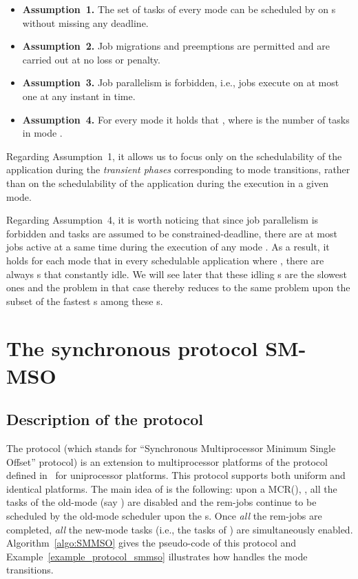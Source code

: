 \documentclass{article}
\newtheorem{validity test}{Validity Test}
\begin{document}
\begin{itemize}
\renewcommand{\labelitemi}{}
\label{null:assumption1}
\item \textbf{Assumption~1.} The set  of tasks of every mode  can be scheduled by  on  s without missing any deadline. 

\item \textbf{Assumption~2.} Job migrations and preemptions are permitted and are carried out at no loss or penalty.

\item \textbf{Assumption~3.} Job parallelism is forbidden, i.e., jobs execute on at most one  at any instant in time. 

\item \textbf{Assumption~4.} For every mode  it holds that , where  is the number of tasks in mode . 
\end{itemize}

Regarding Assumption~1, it allows us to focus only on the schedulability of the application during the {\em transient phases} corresponding to mode transitions, rather than on the schedulability of the application during the execution in a given mode. 

Regarding Assumption~4, it is worth noticing that since job parallelism is forbidden and tasks are assumed to be constrained-deadline, there are at most  jobs active at a same time during the execution of any mode . As a result, it holds for each mode  that in every schedulable application where , there are always  s that constantly idle. We will see later that these  idling s are the slowest ones and the problem in that case thereby reduces to the same problem upon the subset of the  fastest s among these  s. 




\section{The synchronous protocol SM-MSO}
\label{sec:Multimode:SMMSO}

\subsection{Description of the protocol}

The protocol  (which stands for ``Synchronous Multiprocessor Minimum Single Offset'' protocol) is an extension to multiprocessor platforms of the protocol  defined in~\cite{JoAlfons:04} for uniprocessor platforms. This protocol supports both uniform and identical platforms. The main idea of  is the following: upon a MCR(), , all the tasks of the old-mode (say ) are disabled and the rem-jobs continue to be scheduled by the old-mode scheduler  upon the  s. Once \emph{all} the rem-jobs are completed, \emph{all} the new-mode tasks (i.e., the tasks of ) are simultaneously enabled. Algorithm~\ref{algo:SMMSO} gives the pseudo-code of this protocol and Example~\ref{example_protocol_smmso} illustrates how  handles the mode transitions. 
\end{document}
